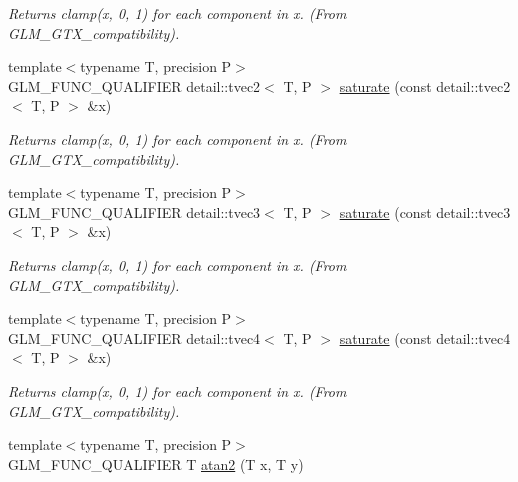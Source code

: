 \begin{CompactItemize}
\begin{CompactList}\small\item\em Returns clamp(x, 0, 1) for each component in x. (From GLM\_\-GTX\_\-compatibility). \item\end{CompactList}\item 
\hypertarget{group__gtx__compatibility_g47b0c02c94f44064bb190ec095947e28}{
{\footnotesize template$<$typename T, precision P$>$ }\\GLM\_\-FUNC\_\-QUALIFIER detail::tvec2$<$ T, P $>$ \hyperlink{group__gtx__compatibility_g47b0c02c94f44064bb190ec095947e28}{saturate} (const detail::tvec2$<$ T, P $>$ \&x)}
\label{group__gtx__compatibility_g47b0c02c94f44064bb190ec095947e28}

\begin{CompactList}\small\item\em Returns clamp(x, 0, 1) for each component in x. (From GLM\_\-GTX\_\-compatibility). \item\end{CompactList}\item 
\hypertarget{group__gtx__compatibility_g6bed80346304d4f33d4256e8abec587e}{
{\footnotesize template$<$typename T, precision P$>$ }\\GLM\_\-FUNC\_\-QUALIFIER detail::tvec3$<$ T, P $>$ \hyperlink{group__gtx__compatibility_g6bed80346304d4f33d4256e8abec587e}{saturate} (const detail::tvec3$<$ T, P $>$ \&x)}
\label{group__gtx__compatibility_g6bed80346304d4f33d4256e8abec587e}

\begin{CompactList}\small\item\em Returns clamp(x, 0, 1) for each component in x. (From GLM\_\-GTX\_\-compatibility). \item\end{CompactList}\item 
\hypertarget{group__gtx__compatibility_ga2254fc526cccf472503dbf68844de77}{
{\footnotesize template$<$typename T, precision P$>$ }\\GLM\_\-FUNC\_\-QUALIFIER detail::tvec4$<$ T, P $>$ \hyperlink{group__gtx__compatibility_ga2254fc526cccf472503dbf68844de77}{saturate} (const detail::tvec4$<$ T, P $>$ \&x)}
\label{group__gtx__compatibility_ga2254fc526cccf472503dbf68844de77}

\begin{CompactList}\small\item\em Returns clamp(x, 0, 1) for each component in x. (From GLM\_\-GTX\_\-compatibility). \item\end{CompactList}\item 
\hypertarget{group__gtx__compatibility_g7af1203c97febe3c07958178aead3788}{
{\footnotesize template$<$typename T, precision P$>$ }\\GLM\_\-FUNC\_\-QUALIFIER T \hyperlink{group__gtx__compatibility_g7af1203c97febe3c07958178aead3788}{atan2} (T x, T y)}
\label{group__gtx__compatibility_g7af1203c97febe3c07958178aead3788}


\end{CompactItemize}
